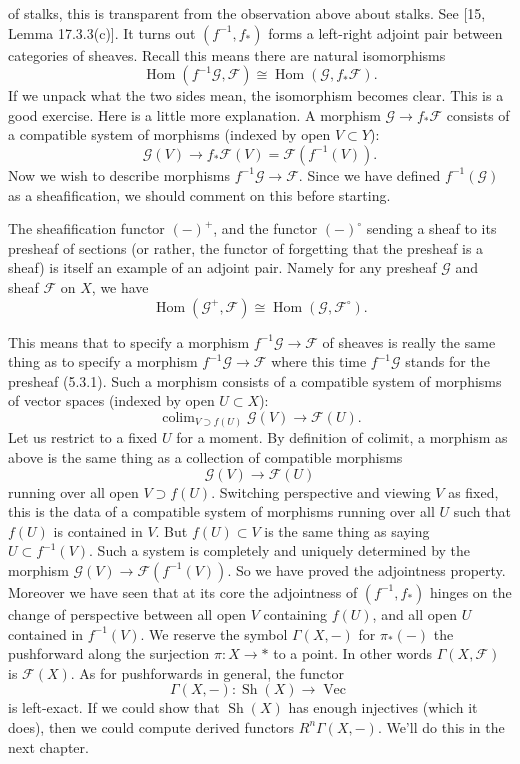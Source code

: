 of stalks, this is transparent from the observation above about stalks. See [15, Lemma
17.3.3(c)].
It turns out $(f^{-1},f_*)$ forms a left-right adjoint pair between categories of sheaves. Recall
this means there are natural isomorphisms
\[
\operatorname{Hom}(f^{-1}\mathcal G,\mathcal F)\cong\operatorname{Hom}(\mathcal G,f_*\mathcal F).
\]
If we unpack what the two sides mean, the isomorphism becomes clear. This is a good
exercise.
Here is a little more explanation. A morphism $\mathcal G\to f_*\mathcal F$ consists of a compatible system of
morphisms (indexed by open $V\subset Y$):
\[
\mathcal G(V)\to f_*\mathcal F(V)=\mathcal F(f^{-1}(V)).
\]
Now we wish to describe morphisms $f^{-1}\mathcal G\to\mathcal F$. Since we have defined
$f^{-1}(\mathcal G)$ as a sheafification, we should comment on this before starting.

\begin{remark}
The sheafification functor $(-)^+$, and the functor $(-)^\circ$ sending a sheaf to its
presheaf of sections (or rather, the functor of forgetting that the presheaf is a sheaf) is itself
an example of an adjoint pair. Namely for any presheaf $\mathcal G$ and sheaf $\mathcal F$ on $X$, we have
\[
\operatorname{Hom}(\mathcal G^+,\mathcal F)\cong\operatorname{Hom}(\mathcal G,\mathcal F^\circ).
\]
\end{remark}

This means that to specify a morphism $f^{-1}\mathcal G\to\mathcal F$ of sheaves is really the same thing as to
specify a morphism $f^{-1}\mathcal G\to\mathcal F$ where this time $f^{-1}\mathcal G$ stands for the presheaf (5.3.1).
Such a morphism consists of a compatible system of morphisms of vector spaces (indexed by open
$U\subset X$):
\[
\operatorname{colim}_{V\supset f(U)}\mathcal G(V)\to\mathcal F(U).
\]
Let us restrict to a fixed $U$ for a moment. By definition of colimit, a morphism as above is
the same thing as a collection of compatible morphisms
\[
\mathcal G(V)\to\mathcal F(U)
\]
running over all open $V\supset f(U)$. Switching perspective and viewing $V$ as fixed, this is the
data of a compatible system of morphisms running over all $U$ such that $f(U)$ is contained
in $V$. But $f(U)\subset V$ is the same thing as saying $U\subset f^{-1}(V)$. Such a system is completely
and uniquely determined by the morphism $\mathcal G(V)\to\mathcal F(f^{-1}(V))$. So we have proved the
adjointness property. Moreover we have seen that at its core the adjointness of $(f^{-1},f_*)$
hinges on the change of perspective between all open $V$ containing $f(U)$, and all open $U$
contained in $f^{-1}(V)$.
We reserve the symbol $\Gamma(X,-)$ for $\pi_*(-)$ the pushforward along the surjection $\pi:X\to *$
to a point. In other words $\Gamma(X,\mathcal F)$ is $\mathcal F(X)$. As for pushforwards in general, the functor
\[
\Gamma(X,-):\operatorname{Sh}(X)\to\operatorname{Vec}
\]
is left-exact. If we could show that $\operatorname{Sh}(X)$ has enough injectives (which it does), then we
could compute derived functors $R^n\Gamma(X,-)$. We'll do this in the next chapter.


